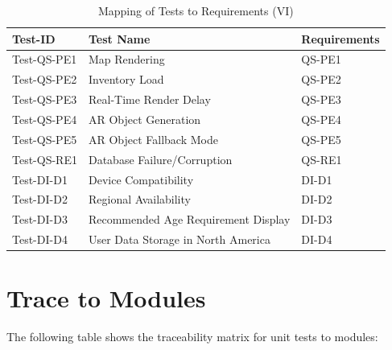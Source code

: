 \documentclass[12pt, titlepage]{article}
\begin{document}
\begin{table}[htpb!]
  \centering
  \begin{tabular}{|l|p{8cm}|p{3cm}|}
    \hline
    \textbf{Test-ID} & \textbf{Test Name}                  & \textbf{Requirements} \\
    \hline
    Test-QS-PE1      & Map Rendering                       & QS-PE1                \\
    \hline
    Test-QS-PE2      & Inventory Load                      & QS-PE2                \\
    \hline
    Test-QS-PE3      & Real-Time Render Delay              & QS-PE3                \\
    \hline
    Test-QS-PE4      & AR Object Generation                & QS-PE4                \\
    \hline
    Test-QS-PE5      & AR Object Fallback Mode             & QS-PE5                \\
    \hline
    Test-QS-RE1      & Database Failure/Corruption         & QS-RE1                \\
    \hline
    Test-DI-D1       & Device Compatibility                & DI-D1                 \\
    \hline
    Test-DI-D2       & Regional Availability               & DI-D2                 \\
    \hline
    Test-DI-D3       & Recommended Age Requirement Display & DI-D3                 \\
    \hline
    Test-DI-D4       & User Data Storage in North America  & DI-D4                 \\
    \hline
  \end{tabular}
  \caption{Mapping of Tests to Requirements (VI)}
  \label{tab:test_requirements6}
\end{table}
\pagebreak

\section{Trace to Modules}

The following table shows the traceability matrix for unit tests to modules:
\end{document}
